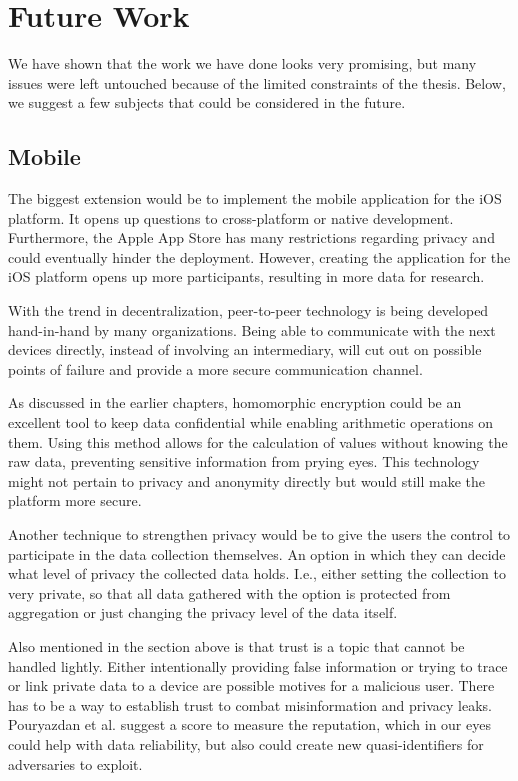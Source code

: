 \section{Future Work}
We have shown that the work we have done looks very promising, but many issues were left untouched because of the limited constraints of the thesis. Below, we suggest a few subjects that could be considered in the future. 

\subsection{Mobile}
The biggest extension would be to implement the mobile application for the iOS platform. It opens up questions to cross-platform or native development. Furthermore, the Apple App Store has many restrictions regarding privacy and could eventually hinder the deployment. However, creating the application for the iOS platform opens up more participants, resulting in more data for research.

With the trend in decentralization, peer-to-peer technology is being developed hand-in-hand by many organizations. Being able to communicate with the next devices directly, instead of involving an intermediary, will cut out on possible points of failure and provide a more secure communication channel.

As discussed in the earlier chapters, homomorphic encryption could be an excellent tool to keep data confidential while enabling arithmetic operations on them. Using this method allows for the calculation of values without knowing the raw data, preventing sensitive information from prying eyes. This technology might not pertain to privacy and anonymity directly but would still make the platform more secure.

Another technique to strengthen privacy would be to give the users the control to participate in the data collection themselves. An option in which they can decide what level of privacy the collected data holds. I.e., either setting the collection to very private, so that all data gathered with the option is protected from aggregation or just changing the privacy level of the data itself.

Also mentioned in the section above is that trust is a topic that cannot be handled lightly. Either intentionally providing false information or trying to trace or link private data to a device are possible motives for a malicious user. There has to be a way to establish trust to combat misinformation and privacy leaks. Pouryazdan et al. \cite{DBLP:journals/access/PouryazdanKSFS17} suggest a score to measure the reputation, which in our eyes could help with data reliability, but also could create new quasi-identifiers for adversaries to exploit.
 
